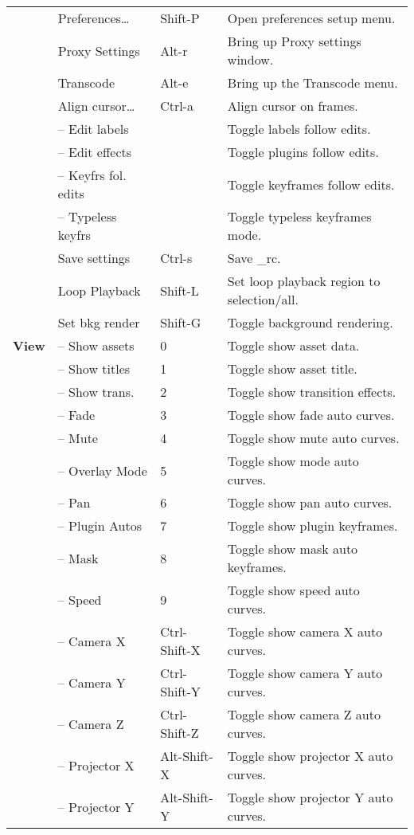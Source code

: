 \begin{longtable}[h]{>{\bfseries}p{}p{}p{}p{}}
  & Preferences\dots & Shift-P & Open preferences setup menu. \\
  & Proxy Settings & Alt-r & Bring up Proxy settings window. \\
  & Transcode & Alt-e & Bring up the Transcode menu. \\
  & Align cursor\dots & Ctrl-a & Align cursor on frames. \\
  & -- Edit labels &  & Toggle labels follow edits. \\
  & -- Edit effects &  & Toggle plugins follow edits. \\
  & -- Keyfrs fol. edits &  & Toggle keyframes follow edits. \\
  & -- Typeless keyfrs &  & Toggle typeless keyframes mode. \\
  & Save settings & Ctrl-s & Save \CGG{}\_rc. \\
  & Loop Playback & Shift-L & Set loop playback region to selection/all. \\
  & Set bkg render & Shift-G & Toggle background rendering. \\
  \midrule
  \textcolor{CinBlueText}{View} & -- Show assets & 0 & Toggle show asset data. \\
  & -- Show titles & 1 & Toggle show asset title. \\
  & -- Show trans. & 2 & Toggle show transition effects. \\
  & -- Fade & 3 & Toggle show fade auto curves. \\
  & -- Mute & 4 & Toggle show mute auto curves. \\
  & -- Overlay Mode & 5 & Toggle show mode auto curves. \\
  & -- Pan & 6 & Toggle show pan auto curves. \\
  & -- Plugin Autos & 7 & Toggle show plugin keyframes. \\
  & -- Mask & 8 & Toggle show mask auto keyframes. \\
  & -- Speed & 9 & Toggle show speed auto curves. \\
  & -- Camera X & Ctrl-Shift-X & Toggle show camera X auto curves. \\
  & -- Camera Y & Ctrl-Shift-Y & Toggle show camera Y auto curves. \\
  & -- Camera Z & Ctrl-Shift-Z & Toggle show camera Z auto curves. \\
  & -- Projector X & Alt-Shift-X & Toggle show projector X auto curves. \\
  & -- Projector Y & Alt-Shift-Y & Toggle show projector Y auto curves. \\

\end{longtable}
